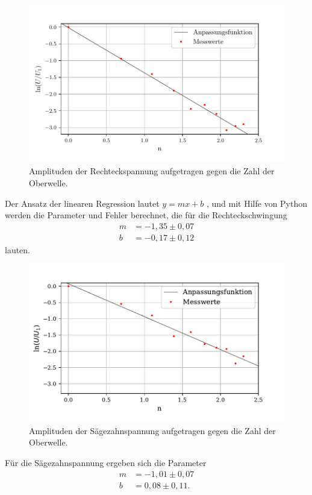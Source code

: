 \begin{figure}
  \centering
  \includegraphics{plot1.pdf}
  \caption{Amplituden der Rechteckspannung aufgetragen gegen die Zahl der Oberwelle.}
  \label{fig:rechteck}
\end{figure}
\noindent Der Ansatz der linearen Regression lautet $y = mx + b$ , und mit Hilfe von Python werden die Parameter und Fehler berechnet, die für die Rechteckschwingung
\begin{align*}
  m &= -1,35 \pm 0,07 \\
  b &= -0,17 \pm 0,12 
\end{align*}
lauten.

\begin{figure}
  \centering
  \includegraphics{plot2.pdf}
  \caption{Amplituden der Sägezahnspannung aufgetragen gegen die Zahl der Oberwelle.}
  \label{fig:rechteck}
\end{figure}
Für die Sägezahnspannung ergeben sich die Parameter
\begin{align*}
  m &= -1,01 \pm 0,07 \\
  b &= 0,08 \pm 0,11 .
\end{align*}

